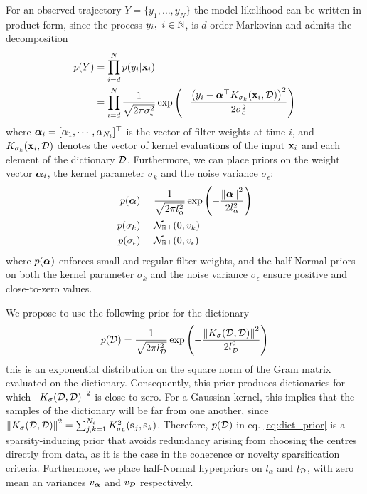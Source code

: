 For an observed trajectory $Y=\{y_1,\ldots, y_N\}$ the model likelihood can be written in product form, since the process $y_i,\ i\in\mathbb{N}$, is $d$-order Markovian and admits the decomposition
\begin{equation}
\begin{split}
    p(Y) &= \prod_{i=d}^{N} p(y_i\vert \mathbf{x}_i) \\ &= \prod_{i=d}^{N} \frac{1}{\sqrt{2\pi\sigma_\epsilon^2}}\exp\left( -\frac{\left(y_i - {\boldsymbol{\alpha}}^\top K_{\sigma_k}(\mathbf{x}_i, \mathcal{D})\right)^2 }{2\sigma_\epsilon^2}\right) 
\end{split}
\end{equation}
where ${\boldsymbol{\alpha}}_i=[\alpha_1,\cdots,\alpha_{N_i}]^\top$ is the vector of filter weights at time $i$, and $K_{\sigma_k}(\mathbf{x}_i, \mathcal{D})$ denotes the vector of kernel evaluations of the input $\mathbf{x}_{i}$ and each element of the dictionary $\mathcal{D}$. Furthermore, we can place priors on the weight vector ${\boldsymbol{\alpha}}_i$, the kernel parameter $\sigma_{k}$ and the noise variance $\sigma_\epsilon$:
\begin{align*}
    p(\balpha) &= \frac{1}{\sqrt{2 \pi l_\alpha^2}}\exp\left( -\frac{\left\| \balpha \right\|^2}{2 l_\alpha^2}  \right)
    \label{eq:coef_prior}\\
   	p(\sigma_{k}) & = \mathcal{N}_{\mathbb{R}^+}(0,v_k)\\ %
	p(\sigma_{\epsilon}) & = \mathcal{N}_{\mathbb{R}^+}(0,v_\epsilon)
\end{align*}
where $p({\boldsymbol{\alpha}})$ enforces small and regular filter weights, and the half-Normal priors on both the kernel parameter $\sigma_k$ and the noise variance $\sigma_\epsilon$ ensure positive and close-to-zero values. 

We propose to use the following prior for the dictionary
\begin{equation}
	 p(\mathcal{D}) = \frac{1}{\sqrt{2 \pi l_{\mathcal{D}}^2}}\exp\left( -\frac{\left\|K_\sigma(\mathcal{D},\mathcal{D}) \right\|^2}{2 l_{\mathcal{D}}^2}  \right)
	\label{eq:dict_prior}
\end{equation}
this is an exponential distribution on the square norm of the Gram matrix evaluated on the dictionary. Consequently, this prior produces dictionaries for which $\left\|K_\sigma(\mathcal{D},\mathcal{D}) \right\|^2$ is close to zero. For a Gaussian kernel, this implies that the samples of the dictionary will be far from one another, since $\left\|K_\sigma(\mathcal{D},\mathcal{D}) \right\|^2 = \sum_{j,k=1}^{N_i}K^2_{\sigma_k}(\mathbf{s}_j,\mathbf{s}_k)$. Therefore, $p(\mathcal{D})$ in eq. \eqref{eq:dict_prior} is a sparsity-inducing prior that avoids redundancy arising from choosing the centres directly from data, as it is the case in the coherence \cite{richard09} or novelty \cite{platt91} sparsification criteria. Furthermore, we place half-Normal hyperpriors on $l_\alpha$ and $l_{\mathcal{D}}$, with zero mean an variances $v_{{\boldsymbol{\alpha}}}$ and $v_{\mathcal{D}}$ respectively.


